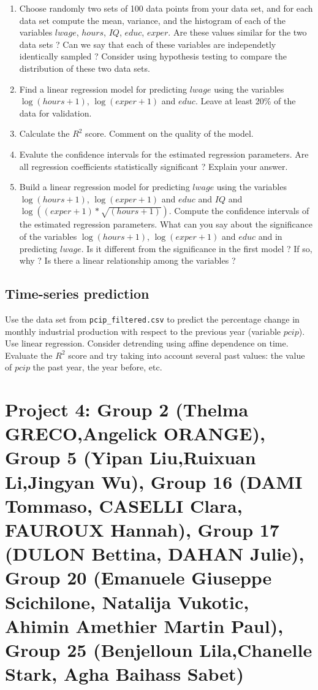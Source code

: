 \documentclass{article}
\begin{document}
  \begin{enumerate}
	 \item Choose randomly two sets of 100 data points from your data set, and for each data set compute the mean, variance, and the histogram
		 of each of the variables  $lwage$, $hours$, $IQ$,  $educ$, $exper$. 
	Are these values similar for the two data sets ?  Can we say that each of these variables are independetly identically sampled ? 
	Consider using hypothesis testing to compare the distribution of these two data sets.



\item Find a linear regression model for predicting $lwage$ using the variables $\log(hours+1)$, $\log(exper+1)$ and $educ$. 
   Leave at least 20\% of the data for validation. 
  \item Calculate the $R^2$ score. Comment on the quality of the model.
  \item Evalute the confidence intervals for the estimated regression parameters. Are all regression coefficients statistically significant ? Explain your answer.
  
  \item Build a linear regression model  for predicting $lwage$ using the variables $\log(hours+1)$, $\log(exper+1)$ and $educ$ and $IQ$
	  and $\log((exper+1)*\sqrt{(hours+1)})$. Compute the confidence intervals of the estimated regression parameters.
	What can you say about the significance of the variables $\log(hours+1)$, $\log(exper+1)$ and $educ$ and 
	in predicting $lwage$.
	Is it different from the significance in the first model ? If so, why ? Is there a linear relationship among the variables ? 

 \end{enumerate}


   
 \subsection*{Time-series prediction}
    Use the data set from \lstinline$pcip_filtered.csv$ to predict the percentage change in monthly
    industrial production with respect to the previous year (variable $pcip$). Use linear regression.
   Consider detrending using affine  dependence on time.  
   Evaluate the $R^2$ score and try taking into account several past values: the value of $pcip$ the past year, the year before, etc. 

\section*{Project 4: Group 2 (Thelma GRECO,Angelick ORANGE), Group  5 (Yipan Liu,Ruixuan Li,Jingyan Wu),
 Group 16 (DAMI Tommaso, CASELLI Clara, FAUROUX Hannah), Group 17 (DULON Bettina, DAHAN Julie),
 Group 20 (Emanuele Giuseppe Scichilone, Natalija Vukotic, Ahimin Amethier Martin Paul),
 Group 25 (Benjelloun Lila,Chanelle Stark, Agha Baihass Sabet)
 }
\end{document}
